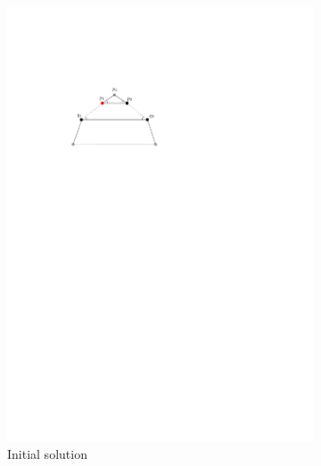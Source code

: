 \documentclass[11pt]{article}
\begin{document}
\begin{figure}[hbtp]
\centering
\begin{subfigure}{.33\linewidth}
  \centering
  \includegraphics[width=0.9\linewidth]{multiplecurves/algo_replace_segment.pdf}
  \caption{Initial solution}
\end{subfigure}%
\begin{subfigure}{.33\linewidth}
  \centering

\end{subfigure}
\end{figure}
\end{document}
